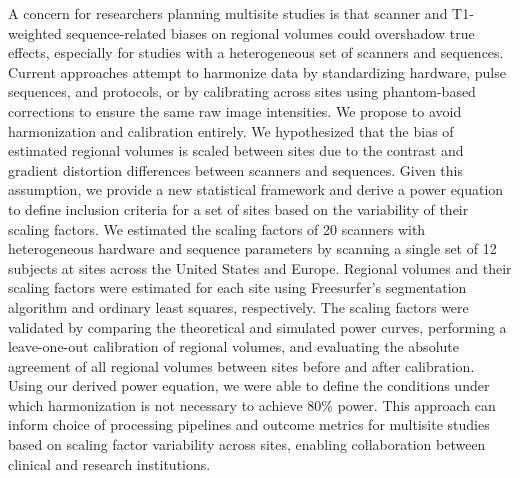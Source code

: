 
A concern for researchers planning multisite studies is that scanner and T1-weighted sequence-related biases on regional volumes could overshadow true effects, especially for studies with a heterogeneous set of scanners and sequences. Current approaches attempt to harmonize data by standardizing hardware, pulse sequences, and protocols, or by calibrating across sites using phantom-based corrections to ensure the same raw image intensities. We propose to avoid harmonization and calibration entirely.  We hypothesized that the bias of estimated regional volumes is scaled between sites due to the contrast and gradient distortion differences between scanners and sequences. Given this assumption, we provide a new statistical framework and derive a power equation to define inclusion criteria for a set of sites based on the variability of their scaling factors. We estimated the scaling factors of 20 scanners with heterogeneous hardware and sequence parameters by scanning a single set of 12 subjects at sites across the United States and Europe. Regional volumes and their scaling factors were estimated for each site using Freesurfer's segmentation algorithm and ordinary least squares, respectively. The scaling factors were validated by comparing the theoretical and simulated power curves, performing a leave-one-out calibration of regional volumes, and evaluating the absolute agreement of all regional volumes between sites before and after calibration. Using our derived power equation, we were able to define the conditions under which harmonization is not necessary to achieve 80\% power. This approach can inform choice of processing pipelines and outcome metrics for multisite studies based on scaling factor variability across sites, enabling collaboration between clinical and research institutions.